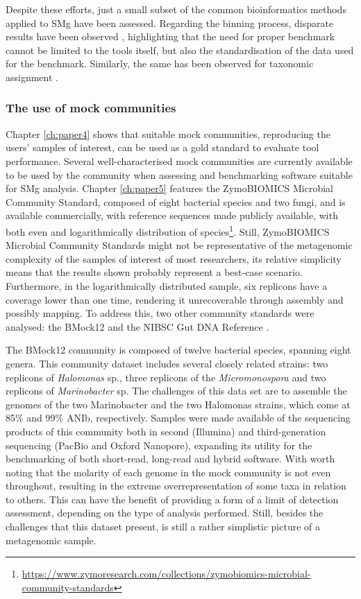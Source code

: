 Despite these efforts, just a small subset of the common bioinformatics methods applied to \ac{SMg} have been assessed. Regarding the binning process, disparate results have been observed \citep{bharti_current_2021, yue_evaluating_2020, yang_review_2021, sczyrba_critical_2017}, highlighting that the need for proper benchmark cannot be limited to the tools itself, but also the standardisation of the data used for the benchmark. Similarly, the same has been observed for taxonomic assignment \citep{sczyrba_critical_2017,ye_benchmarking_2019, tamames_assessing_2019}.

\subsubsection{The use of mock communities}

Chapter \ref{ch:paper4} shows that suitable mock communities, reproducing the users’ samples of interest, can be used as a gold standard to evaluate tool performance. Several well-characterised mock communities are currently available to be used by the community when assessing and benchmarking software suitable for \ac{SMg} analysis. Chapter \ref{ch:paper5} features the ZymoBIOMICS Microbial Community Standard, composed of eight bacterial species and two fungi, and is available commercially, with reference sequences made publicly available, with both even and logarithmically distribution of species\footnote{\url{https://www.zymoresearch.com/collections/zymobiomics-microbial-community-standards}}. Still, ZymoBIOMICS Microbial Community Standards might not be representative of the metagenomic complexity of the samples of interest of most researchers, its relative simplicity means that the results shown probably represent a best-case scenario. Furthermore, in the logarithmically distributed sample, six replicons have a coverage lower than one time, rendering it unrecoverable through assembly and possibly mapping. To address this, two other community standards were analysed: the BMock12 \citep{sevim_shotgun_2019} and the NIBSC Gut DNA Reference \citep{amos_developing_2020}. 

The BMock12 community is composed of twelve bacterial species, spanning eight genera. This community dataset includes several closely related strains: two replicons of \textit{Halomonas} sp., three replicons of the \textit{Micromonospora} and two replicons of \textit{Marinobacter} sp. The challenges of this data set are to assemble the genomes of the two Marinobacter and the two Halomonas strains, which come at 85\% and 99\% ANIb, respectively. Samples were made available of the sequencing products of this community both in second (Illumina) and third-generation sequencing (PacBio and Oxford Nanopore), expanding its utility for the benchmarking of both short-read, long-read and hybrid software. With worth noting that the molarity of each genome in the mock community is not even throughout, resulting in the extreme overrepresentation of some taxa in relation to others. This can have the benefit of providing a form of a limit of detection assessment, depending on the type of analysis performed. Still, besides the challenges that this dataset present, is still a rather simplistic picture of a metagenomic sample.

